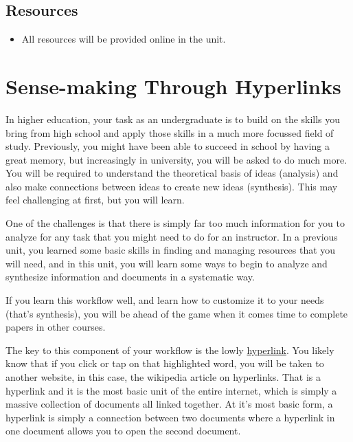 \documentclass[
]{book}
\providecommand{\tightlist}{%
  \setlength{\itemsep}{0pt}\setlength{\parskip}{0pt}}
\theoremstyle{definition}
\theoremstyle{definition}
\theoremstyle{definition}
\theoremstyle{definition}
\theoremstyle{remark}
\begin{document}
\hypertarget{resources-2}{%
\subsection*{Resources}\label{resources-2}}

\begin{itemize}
\tightlist
\item
  All resources will be provided online in the unit.
\end{itemize}

\hypertarget{sense-making-through-hyperlinks}{%
\section{Sense-making Through Hyperlinks}\label{sense-making-through-hyperlinks}}

In higher education, your task as an undergraduate is to build on the skills you bring from high school and apply those skills in a much more focussed field of study. Previously, you might have been able to succeed in school by having a great memory, but increasingly in university, you will be asked to do much more. You will be required to understand the theoretical basis of ideas (analysis) and also make connections between ideas to create new ideas (synthesis). This may feel challenging at first, but you will learn.

One of the challenges is that there is simply far too much information for you to analyze for any task that you might need to do for an instructor. In a previous unit, you learned some basic skills in finding and managing resources that you will need, and in this unit, you will learn some ways to begin to analyze and synthesize information and documents in a systematic way.

If you learn this workflow well, and learn how to customize it to your needs (that's synthesis), you will be ahead of the game when it comes time to complete papers in other courses.

The key to this component of your workflow is the lowly \href{https://en.wikipedia.org/wiki/Hyperlink}{hyperlink}. You likely know that if you click or tap on that highlighted word, you will be taken to another website, in this case, the wikipedia article on hyperlinks. That is a hyperlink and it is the most basic unit of the entire internet, which is simply a massive collection of documents all linked together. At it's most basic form, a hyperlink is simply a connection between two documents where a hyperlink in one document allows you to open the second document.
\end{document}
